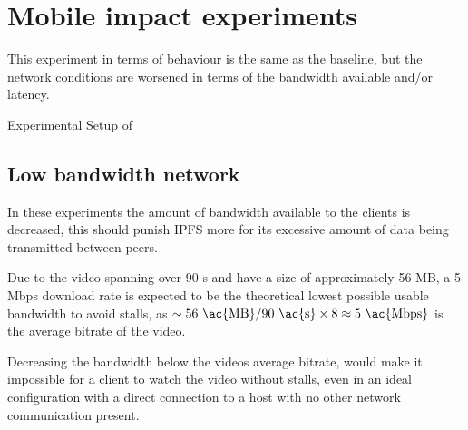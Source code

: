\if{}

\fi


\FloatBarrier \section{Mobile impact experiments}
\label{sec:eval_mobile}
This experiment in terms of behaviour is the same as the baseline, but the network conditions are worsened  in terms of the bandwidth available and/or latency.

\begin{table}[!htbp]
    \myfloatalign
    \caption[Experimental Setup of Mobile]{Experimental Setup of }
    \label{tab:exp_overview_mobile}
    
\end{table}

\subsection{Low bandwidth network}
\label{sec:eval_low_bandwidth}
In these experiments the amount of bandwidth available to the clients is decreased, this should punish \ac{IPFS} more for its excessive amount of data being transmitted between peers.

Due to the video spanning over 90 \ac{s} and have a size of approximately 56 \ac{MB}, a 5 \ac{Mbps} download rate is expected to be the theoretical lowest possible usable bandwidth to avoid stalls, as $\sim56 \text{ \ac{MB}} / 90 \text{ \ac{s}} \times 8 \approx 5 \text{ \ac{Mbps}}$ is the average bitrate of the video.

Decreasing the bandwidth below the videos average bitrate, would make it impossible for a client to watch the video without stalls, even in an ideal configuration with a direct connection to a host with no other network communication present.

